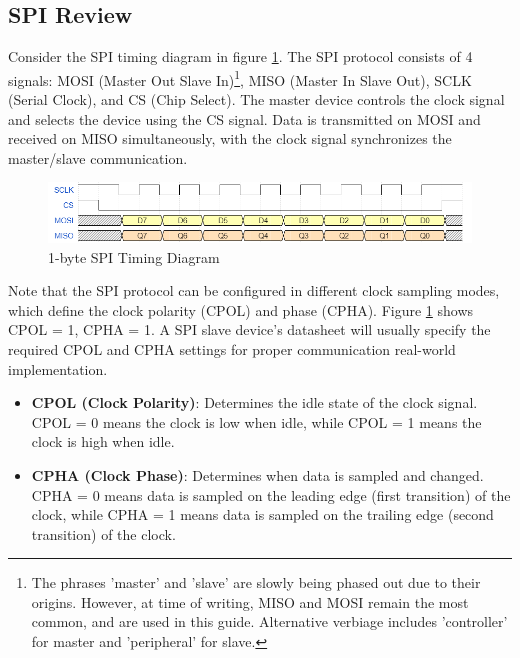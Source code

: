 \documentclass[main.tex]{subfiles}
\begin{document}


\subsection{SPI Review}
Consider the SPI timing diagram in figure \ref{fig:spi_timing}. The SPI protocol consists of 4 signals: MOSI (Master Out Slave In)\footnote{The phrases 'master' and 'slave' are slowly being phased out due to their origins. However, at time of writing, MISO and MOSI remain the most common, and are used in this guide. Alternative verbiage includes 'controller' for master and 'peripheral' for slave.}, MISO (Master In Slave Out), SCLK (Serial Clock), and CS (Chip Select). The master device controls the clock signal and selects the device using the CS signal. Data is transmitted on MOSI and received on MISO simultaneously, with the clock signal synchronizes the master/slave communication.

\begin{figure}[H]
    \centering
    \includegraphics[scale=0.5]{images/spi_sample.png}
    \caption{1-byte SPI Timing Diagram}
    \label{fig:spi_timing}
\end{figure}

\noindent Note that the SPI protocol can be configured in different clock sampling modes, which define the clock polarity (CPOL) and phase (CPHA). Figure \ref{fig:spi_timing} shows CPOL = 1, CPHA = 1. A SPI slave device's datasheet will usually specify the required CPOL and CPHA settings for proper communication real-world implementation.
\begin {itemize}
    \item \textbf{CPOL (Clock Polarity)}: Determines the idle state of the clock signal. CPOL = 0 means the clock is low when idle, while CPOL = 1 means the clock is high when idle.
    \item \textbf{CPHA (Clock Phase)}: Determines when data is sampled and changed. CPHA = 0 means data is sampled on the leading edge (first transition) of the clock, while CPHA = 1 means data is sampled on the trailing edge (second transition) of the clock.
\end{itemize}
\end{document}
